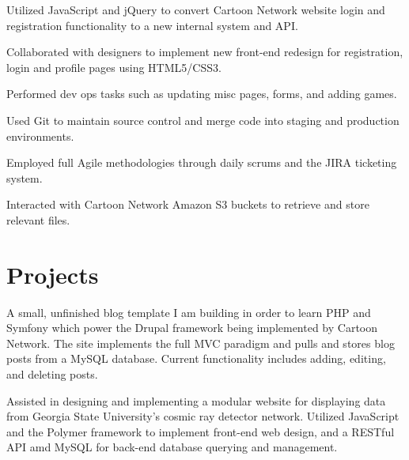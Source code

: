 \documentclass[]{deedy-resume-openfont}
\begin{document}
\begin{minipage}[t]{0.66\textwidth}
\begin{tightemize}
\item Utilized JavaScript and jQuery to convert Cartoon Network website login and registration functionality to a new internal system and API.
\item Collaborated with designers to implement new front-end redesign for registration, login and profile pages using HTML5/CSS3.
\item Performed dev ops tasks such as updating misc pages, forms, and adding games.
\item Used Git to maintain source control and merge code into staging and production environments.
\item Employed full Agile methodologies through daily scrums and the JIRA ticketing system.
\item Interacted with Cartoon Network Amazon S3 buckets to retrieve and store relevant files.
\end{tightemize}
\sectionsep


\section{Projects}
A small, unfinished blog template I am building in order to learn PHP and Symfony which power the Drupal framework being implemented by Cartoon Network. The site implements the full MVC paradigm and pulls and stores blog posts from a MySQL database. Current functionality includes adding, editing, and deleting posts.
\sectionsep

Assisted in designing and implementing a modular website for displaying data from Georgia State University's cosmic ray detector network. Utilized JavaScript and the Polymer framework to implement front-end web design, and a RESTful API amd MySQL for back-end database querying and management.
\sectionsep

\end{minipage} 
\end{document}
